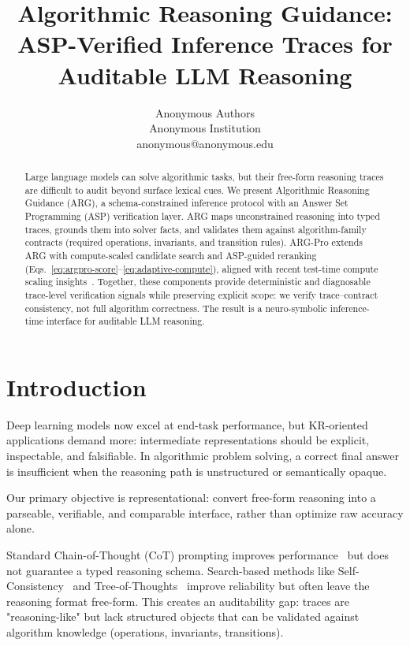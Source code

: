 \documentclass{article}
\title{Algorithmic Reasoning Guidance:\\
ASP-Verified Inference Traces for Auditable LLM Reasoning}
\author{Anonymous Authors\\
\affiliations
Anonymous Institution\\
\emails
anonymous@anonymous.edu
}
\begin{document}
\maketitle

\begin{abstract}
Large language models can solve algorithmic tasks, but their free-form reasoning traces are difficult to audit beyond surface lexical cues. We present Algorithmic Reasoning Guidance (ARG), a schema-constrained inference protocol with an Answer Set Programming (ASP) verification layer. ARG maps unconstrained reasoning into typed traces, grounds them into solver facts, and validates them against algorithm-family contracts (required operations, invariants, and transition rules). ARG-Pro extends ARG with compute-scaled candidate search and ASP-guided reranking (Eqs.~\eqref{eq:argpro-score}--\eqref{eq:adaptive-compute}), aligned with recent test-time compute scaling insights~\cite{snell2024scaling}. Together, these components provide deterministic and diagnosable trace-level verification signals while preserving explicit scope: we verify trace--contract consistency, not full algorithm correctness. The result is a neuro-symbolic inference-time interface for auditable LLM reasoning.
\end{abstract}

\section{Introduction}
Deep learning models now excel at end-task performance, but KR-oriented applications demand more: intermediate representations should be explicit, inspectable, and falsifiable. In algorithmic problem solving, a correct final answer is insufficient when the reasoning path is unstructured or semantically opaque.

Our primary objective is representational: convert free-form reasoning into a parseable, verifiable, and comparable interface, rather than optimize raw accuracy alone.

Standard Chain-of-Thought (CoT) prompting improves performance~\cite{wei2022chain} but does not guarantee a typed reasoning schema. Search-based methods like Self-Consistency~\cite{wang2022self} and Tree-of-Thoughts~\cite{yao2023tree} improve reliability but often leave the reasoning format free-form. This creates an auditability gap: traces are "reasoning-like" but lack structured objects that can be validated against algorithm knowledge (operations, invariants, transitions).
\end{document}
